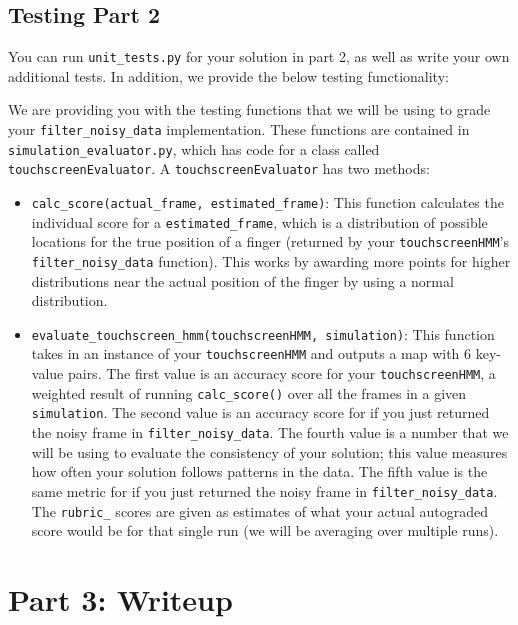 \documentclass{article}
\begin{document}
\subsection{Testing Part 2}
\label{subsec:testingpart2}
You can run \texttt{unit\_tests.py} for your solution in part 2, as well as write your own additional tests. In addition, we provide the below testing functionality:

We are providing you with the testing functions that we will be using to grade your \texttt{filter\_noisy\_data} implementation. These functions are contained in \texttt{simulation\_evaluator.py}, which has code for a class called \texttt{touchscreenEvaluator}. A \texttt{touchscreenEvaluator} has two methods:
\begin{itemize}
    \item \texttt{calc\_score(actual\_frame, estimated\_frame)}:
    This function calculates the individual score for a \texttt{estimated\_frame}, which is a distribution of possible locations for the true position of a finger (returned by your \texttt{touchscreenHMM}'s \texttt{filter\_noisy\_data} function). This works by awarding more points for higher distributions near the actual position of the finger by using a normal distribution.
    \item \texttt{evaluate\_touchscreen\_hmm(touchscreenHMM, simulation)}:
    This function takes in an instance of your \texttt{touchscreenHMM} and outputs a map with 6 key-value pairs. The first value is an accuracy score for your \texttt{touchscreenHMM}, a weighted result of running \texttt{calc\_score()} over all the frames in a given \texttt{simulation}. The second value is an accuracy score for if you just returned the noisy frame in \texttt{filter\_noisy\_data}. The fourth value is a number that we will be using to evaluate the consistency of your solution; this value measures how often your solution follows patterns in the data. The fifth value is the same metric for if you just returned the noisy frame in \texttt{filter\_noisy\_data}. The \texttt{rubric\_} scores are given as estimates of what your actual autograded score would be for that single run (we will be averaging over multiple runs).
\end{itemize}

\section{Part 3: Writeup}
\end{document}
